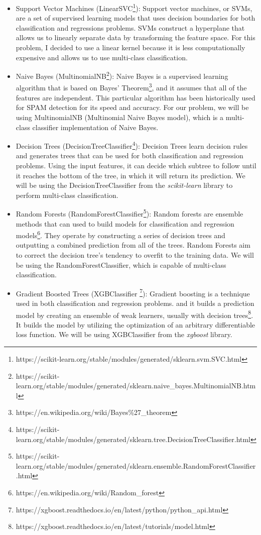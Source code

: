 \documentclass[12pt]{article}
\begin{document}
\begin{itemize}
	\item Support Vector Machines (LinearSVC\footnote{https://scikit-learn.org/stable/modules/generated/sklearn.svm.SVC.html}): Support vector machines, or SVMs, are a set of supervised learning models that uses decision boundaries for both classification and regressions problems. SVMs construct a hyperplane that allows us to linearly separate data by transforming the feature space. For this problem, I decided to use a linear kernel because it is less computationally expensive and allows us to use multi-class classification.
	\item Naive Bayes (MultinomialNB\footnote{https://scikit-learn.org/stable/modules/generated/sklearn.naive\_bayes.MultinomialNB.html}): Naive Bayes is a supervised learning algorithm that is based on Bayes' Theorem\footnote{https://en.wikipedia.org/wiki/Bayes\%27\_theorem}, and it assumes that all of the features are independent. This particular algorithm has been historically used for SPAM detection for its speed and accuracy. For our problem, we will be using MultinomialNB (Multinomial Naive Bayes model), which is a multi-class classifier implementation of Naive Bayes.
	\item Decision Trees (DecisionTreeClassifier\footnote{https://scikit-learn.org/stable/modules/generated/sklearn.tree.DecisionTreeClassifier.html}): Decision Trees learn decision rules and generates trees that can be used for both classification and regression problems. Using the input features, it can decide which subtree to follow until it reaches the bottom of the tree, in which it will return its prediction. We will be using the DecisionTreeClassifier from the \textit{scikit-learn} library to perform multi-class classification.
	\item Random Forests (RandomForestClassifier\footnote{https://scikit-learn.org/stable/modules/generated/sklearn.ensemble.RandomForestClassifier.html}): Random forests are ensemble methods that can used to build models for classification and regression models\footnote{https://en.wikipedia.org/wiki/Random\_forest}. They operate by constructing a series of decision trees and outputting a combined prediction from all of the trees. Random Forests aim to correct the decision tree's tendency to overfit to the training data. We will be using the RandomForestClassifier, which is capable of multi-class classification.
	\item Gradient Boosted Trees (XGBClassifier \footnote{https://xgboost.readthedocs.io/en/latest/python/python\_api.html}): Gradient boosting is a technique used in both classification and regression problems. and it builds a prediction model by creating an ensemble of weak learners, usually with decision trees\footnote{https://xgboost.readthedocs.io/en/latest/tutorials/model.html}. It builds the model by utilizing the optimization of an arbitrary differentiable loss function. We will be using XGBClassifier from the \textit{xgboost} library.
\end{itemize}
\end{document}
